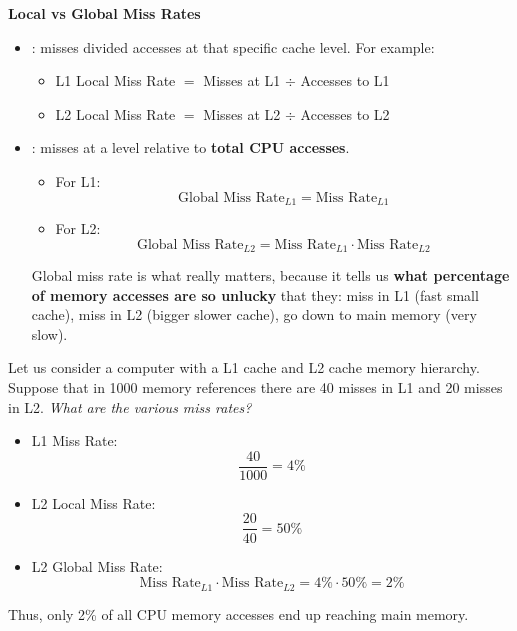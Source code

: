 \highspace
\begin{flushleft}
    \textcolor{Green3}{ \textbf{Local vs Global Miss Rates}}
\end{flushleft}
\begin{itemize}
    \item {}: misses divided accesses at that specific cache level. For example:
    \begin{itemize}
        \item L1 Local Miss Rate $=$ Misses at L1 $\div$ Accesses to L1
        \item L2 Local Miss Rate $=$ Misses at L2 $\div$ Accesses to L2
    \end{itemize}

    \item {}: misses at a level relative to \textbf{total CPU accesses}.
    \begin{itemize}
        \item For L1:
        \begin{equation}
            \text{Global Miss Rate}_{L1} = \text{Miss Rate}_{L1}
        \end{equation}
        \item For L2:
        \begin{equation}
            \text{Global Miss Rate}_{L2} = \text{Miss Rate}_{L1} \cdot \text{Miss Rate}_{L2}
        \end{equation}
    \end{itemize}
    Global miss rate is what really matters, because it tells us \textbf{what percentage of memory accesses are so unlucky} that they: miss in L1 (fast small cache), miss in L2 (bigger slower cache), go down to main memory (very slow).
\end{itemize}

\begin{examplebox}
    Let us consider a computer with a L1 cache and L2 cache memory hierarchy. Suppose that in 1000 memory references there are 40 misses in L1 and 20 misses in L2. \emph{What are the various miss rates?}
    \begin{itemize}
        \item L1 Miss Rate:
        \begin{equation*}
            \frac{40}{1000} = 4\%
        \end{equation*}
        \item L2 Local Miss Rate:
        \begin{equation*}
            \frac{20}{40} = 50\%
        \end{equation*}
        \item L2 Global Miss Rate:
        \begin{equation*}
            \text{Miss Rate}_{L1} \cdot \text{Miss Rate}_{L2} = 4\% \cdot 50\% = 2\%
        \end{equation*}
    \end{itemize}
    Thus, only 2\% of all CPU memory accesses end up reaching main memory.
\end{examplebox}

